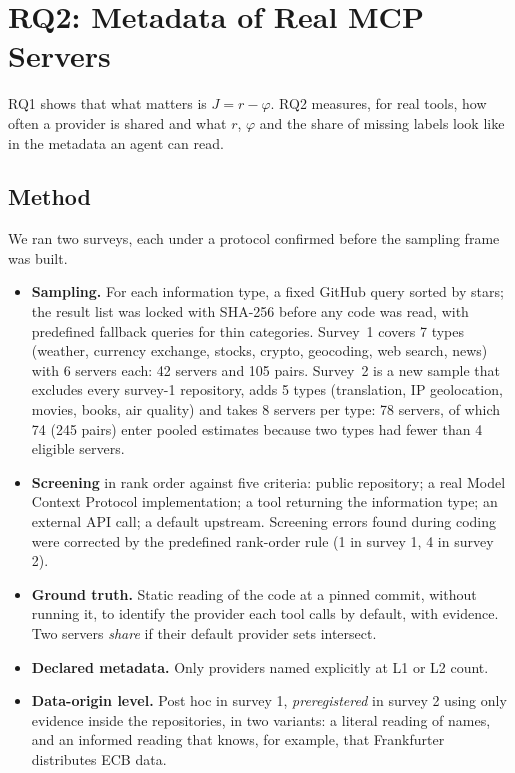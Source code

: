 \section{RQ2: Metadata of Real MCP Servers}\label{sec:rq2}

RQ1 shows that what matters is $J=r-\varphi$. RQ2 measures, for real tools, how often a provider is shared and what $r$, $\varphi$ and the share of missing labels look like in the metadata an agent can read.

\subsection{Method}

We ran two surveys, each under a protocol confirmed before the sampling frame was built.
\begin{itemize}
  \item \textbf{Sampling.} For each information type, a fixed GitHub query  sorted by stars; the result list was locked with SHA-256 before any code was read, with predefined fallback queries for thin categories. Survey~1 covers 7 types (weather, currency exchange, stocks, crypto, geocoding, web search, news) with 6 servers each: 42 servers and 105 pairs. Survey~2 is a new sample that excludes every survey-1 repository, adds 5 types (translation, IP geolocation, movies, books, air quality) and takes 8 servers per type: 78 servers, of which 74 (245 pairs) enter pooled estimates because two types had fewer than 4 eligible servers.
  \item \textbf{Screening} in rank order against five criteria: public repository; a real Model Context Protocol implementation; a tool returning the information type; an external API call; a default upstream. Screening errors found during coding were corrected by the predefined rank-order rule (1 in survey 1, 4 in survey 2).
  \item \textbf{Ground truth.} Static reading of the code at a pinned commit, without running it, to identify the provider each tool calls by default, with  evidence. Two servers \emph{share} if their default provider sets intersect.
  \item \textbf{Declared metadata.} Only providers named explicitly at L1 or L2 count.
  \item \textbf{Data-origin level.} Post hoc in survey 1, \emph{preregistered} in survey 2 using only evidence inside the repositories, in two variants: a literal reading of names, and an informed reading that knows, for example, that Frankfurter distributes ECB data.

\end{itemize}
